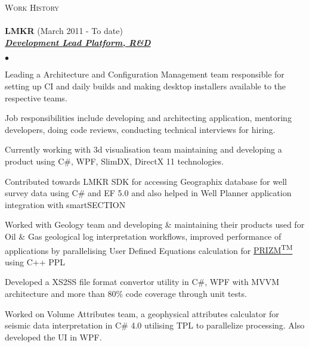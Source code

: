 \documentclass{article}
\newcommand{\lineunder}{\vspace*{-8pt} \\ \hspace*{-18pt} \hrulefill \\}
\newcommand{\header}[1]{{\hspace*{-15pt}\vspace*{6pt} \textsc{#1}} \vspace*{-6pt} \lineunder}
\newcommand{\employer}[3]{{ \textbf{#1} (#2)\\ \underline{\textbf{\emph{#3}}}\\  }}
\newenvironment{achievements}{\begin{list}{$\bullet$}{\topsep 0pt \itemsep -2pt}}{\vspace*{4pt}\end{list}}
\begin{document}
\header{Work History}
\employer{LMKR}{March 2011 - To date}{Development Lead Platform, R\&D}
	\begin{achievements}
	\item Leading a Architecture and Configuration Management team responsible for setting up CI and daily builds and making desktop installers available to the respective teams.
	\item Job responsibilities include developing and architecting application, mentoring developers, doing code reviews, conducting technical interviews for hiring. 
	\item Currently working with 3d visualisation team maintaining and developing a product using C\#, WPF, SlimDX, DirectX 11 technologies.
	\item Contributed towards LMKR SDK for accessing Geographix database for well survey data using C\# and EF 5.0 and also helped in Well Planner application integration with smartSECTION
	\item Worked with Geology team and developing \& maintaining their products used for Oil \& Gas geological log interpretation workflows, improved performance of applications by parallelising User Defined Equations calculation for \href{http://www.lmkr.com/geographix/by-solution/geographix-suite/prizm%E2%84%A2/}{PRIZM\textsuperscript{TM}} using C++ PPL 
	\item Developed a XS2SS file format convertor utility in C\#, WPF with MVVM architecture and more than 80\% code coverage through unit tests.
	\item Worked on Volume Attributes team, a geophysical attributes calculator for seismic data interpretation in C\# 4.0 utilising TPL to parallelize processing. Also developed the UI in WPF.  
	\end{achievements}
\end{document}
